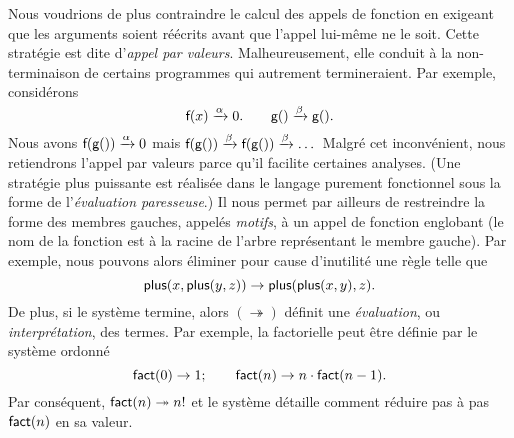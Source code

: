 Nous voudrions de plus contraindre le calcul des appels de fonction en
exigeant que les arguments soient réécrits avant que l'appel lui-même
ne le soit. Cette stratégie est dite d'\emph{appel par
  valeurs}.\label{def:call-by-value} Malheureusement, elle conduit à
la non-terminaison de certains programmes qui autrement termineraient.
Par exemple, considérons
\begin{equation*}
\textsf{f}(x) \xrightarrow{\smash{\alpha}} 0.\qquad
\textsf{g}() \xrightarrow{\smash{\beta}} \textsf{g}().
\end{equation*}
Nous avons \(\textsf{f}(\textsf{g}()) \xrightarrow{\smash{\alpha}} 0\) mais
\(\textsf{f}(\textsf{g}()) \xrightarrow{\smash{\beta}} \textsf{f}(\textsf{g}())
\xrightarrow{\smash{\beta}} \dots\) Malgré cet inconvénient, nous
retiendrons l'appel par valeurs parce qu'il facilite certaines
analyses. (Une stratégie plus puissante est réalisée dans le langage
purement fonctionnel \Haskell \citep{DoetsVanEijck_2004} sous la forme
de l'\emph{évaluation paresseuse}.) Il nous permet par ailleurs de
restreindre la forme des membres gauches, appelés
\emph{motifs}, à un appel de
fonction englobant (le nom de la fonction est à la racine de l'arbre
représentant le membre gauche). Par exemple, nous pouvons alors
éliminer pour cause d'inutilité une règle telle que
\begin{equation*}
\textsf{plus}(x,\textsf{plus}(y,z)) \rightarrow
\textsf{plus}(\textsf{plus}(x,y),z).
\end{equation*}
De plus, si le système termine, alors \((\twoheadrightarrow)\) définit
une \emph{évaluation}, ou
\emph{interprétation}, des termes. Par
exemple, la factorielle
 peut être définie par le
système ordonné
\begin{equation}
\textsf{fact}(0) \rightarrow 1;\qquad
\textsf{fact}(n) \rightarrow n \cdot \textsf{fact}(n-1).
\label{def:fact}
\end{equation}
Par conséquent, \(\textsf{fact}(n) \twoheadrightarrow n!\) et le système
détaille comment réduire pas à pas \(\textsf{fact}(n)\) en sa valeur.

